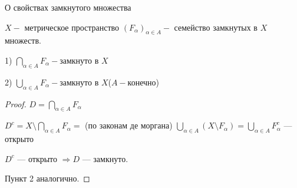     
    \begin{theorem}{О свойствах замкнутого множества}
        
        $X-$ метрическое пространство $(F_\alpha)_{\alpha \in A} - $ семейство замкнутых в $X$ множеств.
    
        1) $\bigcap\limits_{\alpha \in A}F_{\alpha}-$замкнуто в $X$
        
        2) $\bigcup\limits_{\alpha \in A}F_{\alpha}-$замкнуто в $X$($A-$конечно)\\
    \end{theorem}
    \begin{proof}
        $D = \bigcap\limits_{\alpha \in A}F_{\alpha}$
        
        $D^{c} = X \setminus \bigcap\limits_{\alpha \in A}F_{\alpha} = $ (по законам де моргана)
        $\bigcup\limits_{\alpha \in A}(X \setminus F_{\alpha}) = \bigcup\limits_{\alpha \in A}F_{\alpha}^{c}$ --- открыто
        
        $D^{c}$ --- открыто $\Rightarrow D$ --- замкнуто.
        
        Пункт 2 аналогично.
    \end{proof}
\newpage
